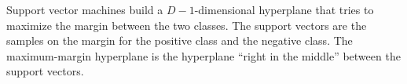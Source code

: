 Support vector machines build a $D-1$-dimensional hyperplane that
tries to maximize the margin between the two classes. The support
vectors are the samples on the margin for the positive class and the
negative class. The maximum-margin hyperplane is the hyperplane
``right in the middle'' between the support vectors.